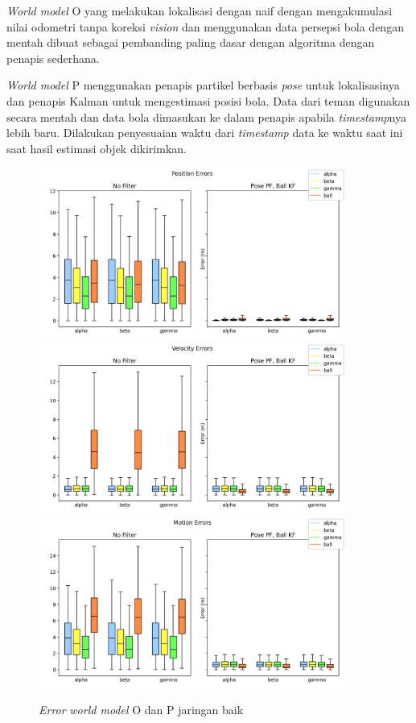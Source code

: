 \textit{World model} O yang melakukan lokalisasi dengan naif dengan mengakumulasi nilai odometri tanpa koreksi \textit{vision} dan menggunakan data persepsi bola dengan mentah dibuat sebagai pembanding paling dasar dengan algoritma dengan penapis sederhana.

\textit{World model} P menggunakan penapis partikel berbasis \textit{pose} untuk lokalisasinya dan penapis Kalman untuk mengestimasi posisi bola. Data dari teman digunakan secara mentah dan data bola dimasukan ke dalam penapis apabila \textit{timestamp}nya lebih baru. Dilakukan penyesuaian waktu dari \textit{timestamp} data ke waktu saat ini saat hasil estimasi objek dikirimkan.

\begin{figure}[p]
    \centering
    \medskip
    \includegraphics[width=0.9\textwidth]{resources/cfg1_AO_AP_error_pos.png}
    \includegraphics[width=0.9\textwidth]{resources/cfg1_AO_AP_error_vel.png}
    \includegraphics[width=0.9\textwidth]{resources/cfg1_AO_AP_error_motion.png}
    \caption{\textit{Error} \textit{world model} O dan P jaringan baik}
    \label{fig:1-o-p-error}
    \bigskip
\end{figure}

